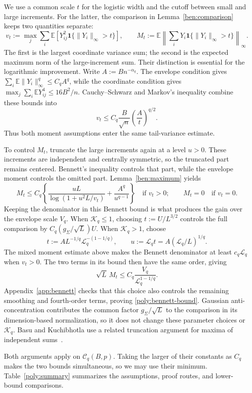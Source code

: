 \documentclass[11pt,letterpaper,twoside,leqno]{article}
\theoremstyle{bookplain}
\theoremstyle{bookremark}
\newcommand{\E}{\mathbb E}
\newcommand{\ind}{\mathbf 1}
\begin{document}
We use a common scale $t$ for the logistic width and the cutoff
between small and large increments. For the latter, the comparison
in Lemma~\ref{ben:comparison} keeps two quantities separate:
\[
 v_t:=\max_j\sum_i\E[Y_{ij}^2\ind\{\|Y_i\|_\infty>t\}],
 \qquad
 M_t:=\E\left\|\sum_iY_i\ind\{\|Y_i\|_\infty>t\}\right\|_\infty.
\]
The first is the largest coordinate variance sum; the second is the
expected maximum norm of the large-increment sum. Their distinction
is essential for the logarithmic improvement.
Write $A:=Bn^{-\alpha_q}$. The envelope condition gives
$\sum_i\E\|Y_i\|_\infty^q\le C_qA^q$, while the coordinate
condition gives $\max_j\sum_i\E Y_{ij}^4\le16B^2/n$.
Cauchy--Schwarz and Markov's inequality combine these bounds into
\[
 v_t\le C_q\frac B{\sqrt n}\left(\frac At\right)^{q/2}.
\]
Thus both moment assumptions enter the same tail-variance estimate.

To control $M_t$, truncate the large increments again at a level
$u>0$. These increments are independent and centrally symmetric,
so the truncated part remains centered. Bennett's inequality
controls that part, while the envelope moment controls the omitted
part. Lemma~\ref{ben:maximum} yields
\[
 M_t\le C_q\left\{
       \frac{uL}{\log(1+u^2L/v_t)}+\frac{A^q}{u^{q-1}}\right\}
 \quad\text{if }v_t>0;
 \qquad M_t=0\quad\text{if }v_t=0.
\]
Keeping the denominator in this Bennett bound is what produces the
gain over the envelope scale $V_q$.
When $\mathcal K_q\le1$, choosing $t:=U/L^{3/2}$ controls the
full comparison by $C_q(g_\Sigma/\sqrt L)U$.
When $\mathcal K_q>1$, choose
\[
 t:=A L^{-1/q}\mathcal L_q^{-(1-1/q)},\qquad
 u:=\mathcal L_q t=A(\mathcal L_q/L)^{1/q}.
\]
The mixed moment estimate above makes the Bennett denominator at
least $c_q\mathcal L_q$ when $v_t>0$. The two terms in its bound
then have the same order, giving
\[
 \sqrt L\,M_t\le C_q\frac{V_q}{\mathcal L_q^{1-1/q}}.
\]
Appendix~\ref{app:bennett} checks that this choice also controls
the remaining smoothing and fourth-order terms, proving
\eqref{poly:bennett-bound}. Gaussian anti-concentration contributes
the common factor $g_\Sigma/\sqrt L$ to the comparison in its
dimension-based normalization, so it does not change these parameter
choices or $\mathcal K_q$.
Basu and Kuchibhotla use a related truncation argument for maxima
of independent sums~\cite[Proposition~4.2]{BK2025}.

Both arguments apply on $\mathcal C_q(B,p)$. Taking the larger of
their constants as $C_q$ makes the two bounds simultaneous, so we may
use their minimum. Table~\ref{poly:summary} summarizes the assumptions,
proof routes, and lower-bound comparisons.
\end{document}
